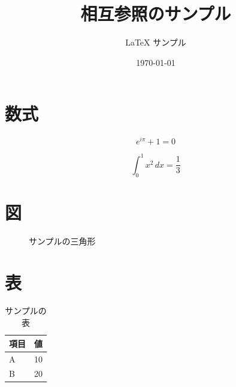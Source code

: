 \documentclass[lualatex,ja=standard]{bxjsarticle}
\title{相互参照のサンプル}
\author{LaTeX サンプル}
\date{\today}
\begin{document}
\maketitle
\tableofcontents

\section{数式}
\label{sec:math}

\begin{equation}
  e^{i\pi} + 1 = 0
  \label{eq:euler}
\end{equation}

\begin{equation}
  \int_0^1 x^2 \, dx = \frac{1}{3}
  \label{eq:integral}
\end{equation}

\section{図}
\label{sec:fig}

\begin{figure}[h]
  \centering
  \caption{サンプルの三角形}
  \label{fig:triangle}
\end{figure}

\section{表}
\label{sec:tab}

\begin{table}[h]
  \centering
  \caption{サンプルの表}
  \label{tab:sample}
  \begin{tabular}{|l|r|}
    \hline
    項目 & 値 \\
    \hline
    A    & 10 \\
    B    & 20 \\
    \hline
  \end{tabular}
\end{table}

\end{document}
